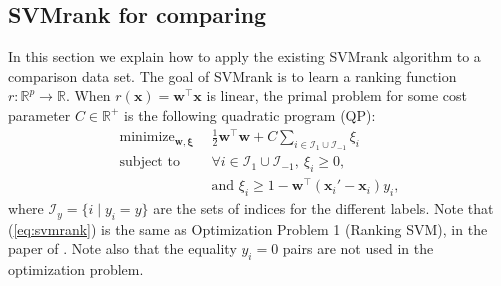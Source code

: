 \documentclass[twoside,11pt]{article}
\newcommand{\RR}{\mathbb R}
\DeclareMathOperator*{\minimize}{minimize}
\begin{document}

\subsection{SVMrank for comparing}
\label{sec:svmrank}
In this section we explain how to apply the existing SVMrank algorithm
to a comparison data set.  The goal of SVMrank is to learn a ranking
function $r:\RR^p \rightarrow \RR$. When $r(\mathbf x)=\mathbf
w^\intercal \mathbf x$ is linear, the primal problem for some cost
parameter $C\in\RR^+$ is the following quadratic program (QP):
\begin{equation}
  \begin{aligned}
    \minimize_{\mathbf w, \mathbf \xi}\ \ & \frac 1 2
    \mathbf w^\intercal \mathbf w
    + C \sum_{i\in \mathcal I_1\cup \mathcal I_{-1}} \xi_i \\
    \text{subject to}\ \ &
    \forall i\in \mathcal I_1\cup \mathcal I_{-1},\ \xi_i \geq 0,\\
    & \text{and }\xi_i \geq 1-\mathbf w^\intercal(\mathbf x_i'-\mathbf
    x_i)y_i,
  \end{aligned}
  \label{eq:svmrank}
\end{equation}
where $\mathcal I_y=\{i\mid y_i=y\}$ are the sets of indices for the different
labels. Note that (\ref{eq:svmrank}) is the same as Optimization
Problem 1 (Ranking SVM), in the paper of \citet{ranksvm}. Note also
that the equality $y_i=0$ pairs are not used in the optimization
problem.
\end{document}
